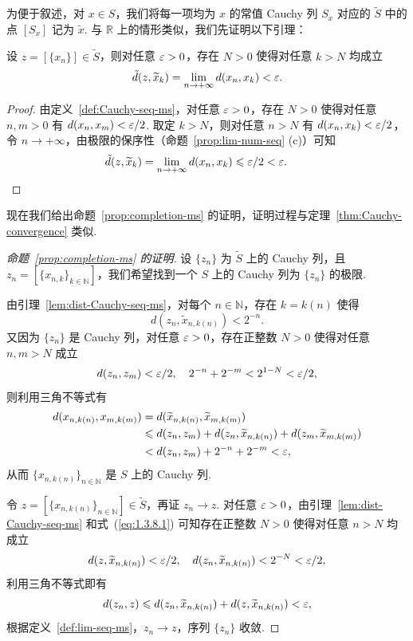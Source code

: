 \documentclass[../main.tex]{subfiles}
\begin{document}
为便于叙述，对 $x \in S$，我们将每一项均为 $x$ 的常值 Cauchy 列 $S_x$ 对应的 $\widetilde{S}$ 中的点 $[S_x]$ 记为 $\widetilde{x}$. 与 $\mathbb R$ 上的情形类似，我们先证明以下引理：

\begin{lemma} \label{lem:dist-Cauchy-seq-ms}
    设 $z = [\{x_n\}] \in \widetilde{S}$，则对任意 $\varepsilon > 0$，存在 $N > 0$ 使得对任意 $k > N$ 均成立 
    $$
    \tilde{d}(z, \widetilde{x}_k) = \lim\limits_{n \to +\infty} d(x_n, x_k) < \varepsilon. 
    $$
\end{lemma}

\begin{proof}
    由定义~\ref{def:Cauchy-seq-ms}，对任意 $\varepsilon > 0$，存在 $N > 0$ 使得对任意 $n, m > 0$ 有 $d(x_n, x_m) < \varepsilon / 2$. 取定 $k > N$，则对任意 $n > N$ 有 $d(x_n, x_k) < \varepsilon / 2$，令 $n \to +\infty$，由极限的保序性（命题~\ref{prop:lim-num-seq} (c)）可知
    \begin{equation*}
        \tilde{d}(z, \widetilde{x}_k) = \lim\limits_{n \to +\infty} d(x_n, x_k) \leqslant \varepsilon / 2 < \varepsilon. \tag*{\qedhere}
    \end{equation*}
\end{proof}

现在我们给出命题~\ref{prop:completion-ms} 的证明，证明过程与定理~\ref{thm:Cauchy-convergence} 类似. 

\begin{proof}[命题~\ref{prop:completion-ms} 的证明]
    设 $\{z_n\}$ 为 $\widetilde{S}$ 上的 Cauchy 列，且 $z_n = [\{x_{n, k}\}_{k \in \mathbb N}]$，我们希望找到一个 $S$ 上的 Cauchy 列为 $\{z_n\}$ 的极限. 

    由引理~\ref{lem:dist-Cauchy-seq-ms}，对每个 $n \in \mathbb N$，存在 $k = k(n)$ 使得 
    \begin{equation} \label{eq:1.3.8.1}
        d(z_n, \widetilde{x}_{n, k(n)}) < 2^{-n}. 
    \end{equation}
    又因为 $\{z_n\}$ 是 Cauchy 列，对任意 $\varepsilon > 0$，存在正整数 $N > 0$ 使得对任意 $n, m > N$ 成立
    $$
    d(z_n, z_m) < \varepsilon / 2, \quad 2^{-n} + 2^{-m} < 2^{1 - N} < \varepsilon / 2, 
    $$
    则利用三角不等式有
    \begin{align*}
        d(x_{n, k(n)}, x_{m, k(m)}) &= d(\widetilde{x}_{n, k(n)}, \widetilde{x}_{m, k(m)}) \\
        &\leqslant d(z_n, z_m) + d(z_n, \widetilde{x}_{n, k(n)}) + d(z_m, \widetilde{x}_{m, k(m)}) \\
        &< d(z_n, z_m) + 2^{-n} + 2^{-m} < \varepsilon, 
    \end{align*}
    从而 $\{x_{n, k(n)}\}_{n \in \mathbb N}$ 是 $S$ 上的 Cauchy 列. 
    
    令 $z = [\{x_{n, k(n)}\}_{n \in \mathbb N}] \in \widetilde{S}$，再证 $z_n \to z$. 对任意 $\varepsilon > 0$，由引理~\ref{lem:dist-Cauchy-seq-ms} 和式~(\ref{eq:1.3.8.1}) 可知存在正整数 $N > 0$ 使得对任意 $n > N$ 均成立
    $$
    d(z, \widetilde{x}_{n, k(n)}) < \varepsilon / 2, \quad d(z_n, \widetilde{x}_{n, k(n)}) < 2^{-N} < \varepsilon / 2, 
    $$
    利用三角不等式即有
    $$
    d(z_n, z) \leqslant d(z_n, \widetilde{x}_{n, k(n)}) + d(z, \widetilde{x}_{n, k(n)}) < \varepsilon, 
    $$
    根据定义~\ref{def:lim-seq-ms}，$z_n \to z$，序列 $\{z_n\}$ 收敛. 
\end{proof}
\end{document}
